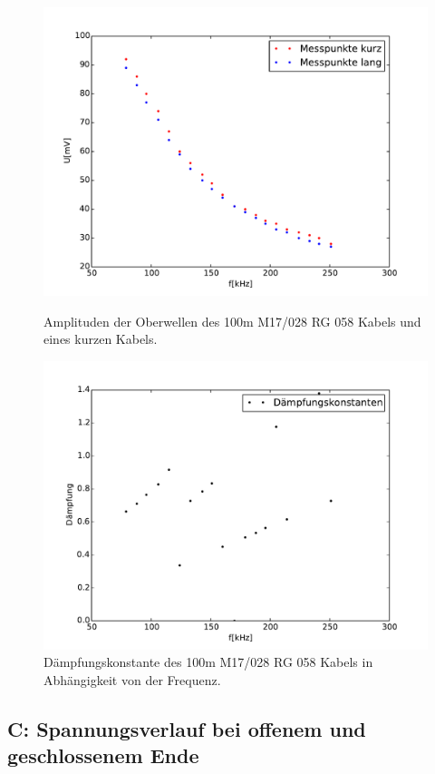\begin{figure}
	\centering
	\includegraphics[width = 14cm]{data/b/alpha_zeit.pdf}
	\caption[]{Amplituden der Oberwellen des 100m M17/028 RG 058 Kabels und eines kurzen Kabels.}
	\label{fig_daempf1}
	\includegraphics[width = 14cm]{data/b/alpha.pdf}
	\caption[]{Dämpfungskonstante des 100m M17/028 RG 058 Kabels in Abhängigkeit von der Frequenz.}
	\label{fig_daempf2}
\end{figure}

\FloatBarrier
\subsection{C: Spannungsverlauf bei offenem und geschlossenem Ende} %
\label{sub:c_laengenmessung}


